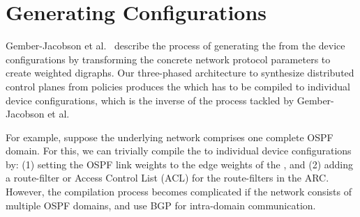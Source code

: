 \section{Generating Configurations}
Gember-Jacobson et al.~\cite{arc} describe the process 
of generating the \ARC from the device configurations by transforming 
the concrete network protocol parameters to create weighted digraphs. 
Our three-phased architecture to synthesize distributed control planes
from policies produces the \ARC which has to be compiled to 
individual device configurations, which is the inverse of 
the process tackled by Gember-Jacobson et al. ~

For example, suppose the underlying network comprises 
one complete OSPF domain. For this, we can trivially
compile the \ARC to individual device configurations by: (1)
setting the OSPF link weights to the edge weights of the \ARC, and
(2) adding a route-filter or Access Control List (ACL) for the 
route-filters in the ARC. However, the compilation process becomes
complicated if the network consists of multiple OSPF 
domains, and use BGP for intra-domain communication. 